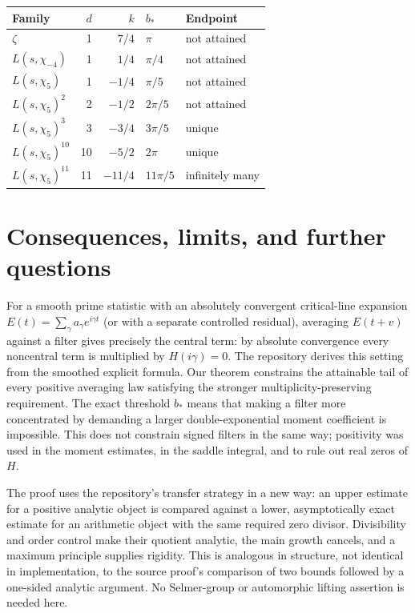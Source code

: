 \documentclass[11pt]{article}
\theoremstyle{remark}\newtheorem{remark}[theorem]{Remark}
\begin{document}
\begin{center}
\small
\begin{tabular}{@{}lrrll@{}}
\toprule
Family & $d$ & $k$ & $b_*$ & Endpoint\\
\midrule
$\zeta$ &1&$7/4$&$\pi$& not attained\\
$L(s,\chi_{-4})$&1&$1/4$&$\pi/4$& not attained\\
$L(s,\chi_5)$&1&$-1/4$&$\pi/5$& not attained\\
$L(s,\chi_5)^2$&2&$-1/2$&$2\pi/5$& not attained\\
$L(s,\chi_5)^3$&3&$-3/4$&$3\pi/5$& unique\\
$L(s,\chi_5)^{10}$&10&$-5/2$&$2\pi$& unique\\
$L(s,\chi_5)^{11}$&11&$-11/4$&$11\pi/5$& infinitely many\\
\bottomrule
\end{tabular}
\end{center}

\section{Consequences, limits, and further questions}
For a smooth prime statistic with an absolutely convergent critical-line expansion $E(t)=\sum_\gamma a_\gamma e^{i\gamma t}$ (or with a separate controlled residual), averaging $E(t+v)$ against a filter gives precisely the central term: by absolute convergence every noncentral term is multiplied by $H(i\gamma)=0$. The repository derives this setting from the smoothed explicit formula. Our theorem constrains the attainable tail of every positive averaging law satisfying the stronger multiplicity-preserving requirement. The exact threshold $b_*$ means that making a filter more concentrated by demanding a larger double-exponential moment coefficient is impossible. This does not constrain signed filters in the same way; positivity was used in the moment estimates, in the saddle integral, and to rule out real zeros of $H$.

The proof uses the repository's transfer strategy in a new way: an upper estimate for a positive analytic object is compared against a lower, asymptotically exact estimate for an arithmetic object with the same required zero divisor. Divisibility and order control make their quotient analytic, the main growth cancels, and a maximum principle supplies rigidity. This is analogous in structure, not identical in implementation, to the source proof's comparison of two bounds followed by a one-sided analytic argument. No Selmer-group or automorphic lifting assertion is needed here.
\end{document}
